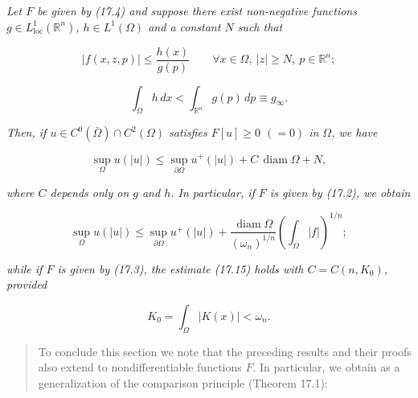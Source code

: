 \begin{theorem}[Theorem 17.4]\label{gt-ch17-thm-17-4}
\textit{Let $F$ be given by (17.4) and suppose there exist non-negative functions $g \in L^1_{\mathrm{loc}}(\mathbb{R}^n)$, $h \in L^1(\Omega)$ and a constant $N$ such that}

\begin{equation}\tag{17.13}
\lvert f(x, z, p)\rvert \leq \frac{h(x)}{g(p)}
\qquad \forall x \in \Omega,\ |z| \geq N,\ p \in \mathbb{R}^n;
\end{equation}

\begin{equation}\tag{17.14}
\int_{\Omega} h\,dx < \int_{\mathbb{R}^n} g(p)\,dp \equiv g_{\infty}.
\end{equation}

\noindent\textit{Then, if $u \in C^0(\bar{\Omega}) \cap C^2(\Omega)$ satisfies $F[u] \geq 0$ $(=0)$ in $\Omega$, we have}

\begin{equation}\tag{17.15}
\sup_{\Omega} u(|u|) \leq \sup_{\partial\Omega} u^+(|u|) + C\,\operatorname{diam}\Omega + N,
\end{equation}

\noindent\textit{where $C$ depends only on $g$ and $h$. In particular, if $F$ is given by (17.2), we obtain}

\begin{equation}\tag{17.16}
\sup_{\Omega} u(|u|) \leq \sup_{\partial\Omega} u^+(|u|) + \frac{\operatorname{diam}\Omega}{(\omega_n)^{1/n}}\left(\int_{\Omega} |f|\right)^{1/n};
\end{equation}

\noindent\textit{while if $F$ is given by (17.3), the estimate (17.15) holds with $C = C(n, K_0)$, provided}

\begin{equation}\tag{17.17}
K_0 = \int_{\Omega} \lvert K(x)\rvert < \omega_n.
\end{equation}
\end{theorem}


\begin{quote}
To conclude this section we note that the preceding results and their proofs also extend to nondifferentiable functions $F$. In particular, we obtain as a generalization of the comparison principle (Theorem 17.1):
\end{quote}

